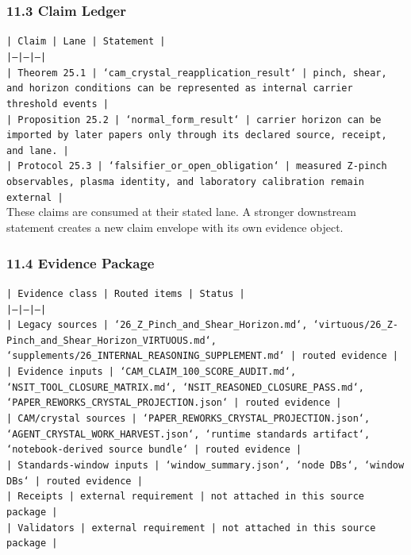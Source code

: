 \documentclass[11pt]{article}
\begin{document}
\subsubsection*{11.3 Claim Ledger}

\noindent\texttt{| Claim | Lane | Statement |}\\
\noindent\texttt{|---|---|---|}\\
\noindent\texttt{| Theorem 25.1 | `cam\_crystal\_reapplication\_result` | pinch, shear, and horizon conditions can be represented as internal carrier threshold events |}\\
\noindent\texttt{| Proposition 25.2 | `normal\_form\_result` | carrier horizon can be imported by later papers only through its declared source, receipt, and lane. |}\\
\noindent\texttt{| Protocol 25.3 | `falsifier\_or\_open\_obligation` | measured Z-pinch observables, plasma identity, and laboratory calibration remain external |}\\

These claims are consumed at their stated lane. A stronger downstream statement
creates a new claim envelope with its own evidence object.

\subsubsection*{11.4 Evidence Package}

\noindent\texttt{| Evidence class | Routed items | Status |}\\
\noindent\texttt{|---|---|---|}\\
\noindent\texttt{| Legacy sources | `26\_Z\_Pinch\_and\_Shear\_Horizon.md`, `virtuous/26\_Z-Pinch\_and\_Shear\_Horizon\_VIRTUOUS.md`, `supplements/26\_INTERNAL\_REASONING\_SUPPLEMENT.md` | routed evidence |}\\
\noindent\texttt{| Evidence inputs | `CAM\_CLAIM\_100\_SCORE\_AUDIT.md`, `NSIT\_TOOL\_CLOSURE\_MATRIX.md`, `NSIT\_REASONED\_CLOSURE\_PASS.md`, `PAPER\_REWORKS\_CRYSTAL\_PROJECTION.json` | routed evidence |}\\
\noindent\texttt{| CAM/crystal sources | `PAPER\_REWORKS\_CRYSTAL\_PROJECTION.json`, `AGENT\_CRYSTAL\_WORK\_HARVEST.json`, `runtime standards artifact`, `notebook-derived source bundle` | routed evidence |}\\
\noindent\texttt{| Standards-window inputs | `window\_summary.json`, `node DBs`, `window DBs` | routed evidence |}\\
\noindent\texttt{| Receipts | external requirement | not attached in this source package |}\\
\noindent\texttt{| Validators | external requirement | not attached in this source package |}\\
\end{document}
